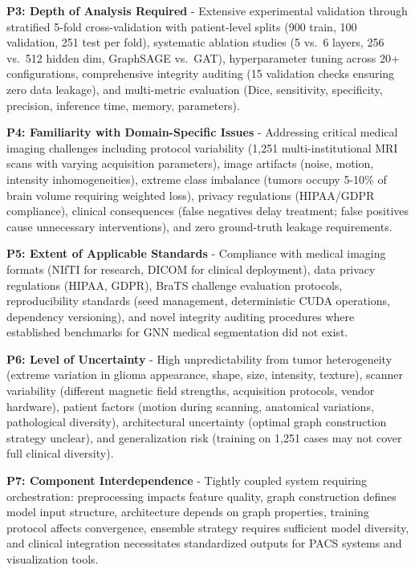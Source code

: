 \textbf{P3: Depth of Analysis Required} - Extensive experimental validation through stratified 5-fold cross-validation with patient-level splits (900 train, 100 validation, 251 test per fold), systematic ablation studies (5 vs.\ 6 layers, 256 vs.\ 512 hidden dim, GraphSAGE vs.\ GAT), hyperparameter tuning across 20+ configurations, comprehensive integrity auditing (15 validation checks ensuring zero data leakage), and multi-metric evaluation (Dice, sensitivity, specificity, precision, inference time, memory, parameters).

\textbf{P4: Familiarity with Domain-Specific Issues} - Addressing critical medical imaging challenges including protocol variability (1,251 multi-institutional MRI scans with varying acquisition parameters), image artifacts (noise, motion, intensity inhomogeneities), extreme class imbalance (tumors occupy 5-10\% of brain volume requiring weighted loss), privacy regulations (HIPAA/GDPR compliance), clinical consequences (false negatives delay treatment; false positives cause unnecessary interventions), and zero ground-truth leakage requirements.

\textbf{P5: Extent of Applicable Standards} - Compliance with medical imaging formats (NIfTI for research, DICOM for clinical deployment), data privacy regulations (HIPAA, GDPR), BraTS challenge evaluation protocols, reproducibility standards (seed management, deterministic CUDA operations, dependency versioning), and novel integrity auditing procedures where established benchmarks for GNN medical segmentation did not exist.

\textbf{P6: Level of Uncertainty} - High unpredictability from tumor heterogeneity (extreme variation in glioma appearance, shape, size, intensity, texture), scanner variability (different magnetic field strengths, acquisition protocols, vendor hardware), patient factors (motion during scanning, anatomical variations, pathological diversity), architectural uncertainty (optimal graph construction strategy unclear), and generalization risk (training on 1,251 cases may not cover full clinical diversity).

\textbf{P7: Component Interdependence} - Tightly coupled system requiring orchestration: preprocessing impacts feature quality, graph construction defines model input structure, architecture depends on graph properties, training protocol affects convergence, ensemble strategy requires sufficient model diversity, and clinical integration necessitates standardized outputs for PACS systems and visualization tools.

